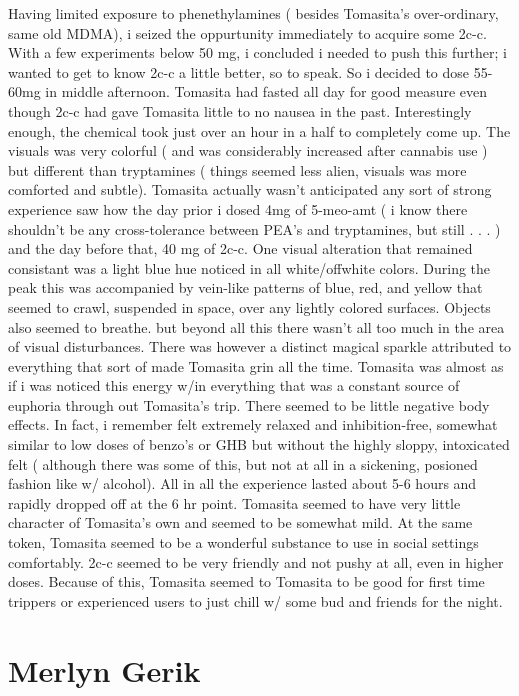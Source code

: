 \documentclass[12pt]{book}
\begin{document}
Having limited exposure to phenethylamines ( besides Tomasita's over-ordinary, same old MDMA), i seized the oppurtunity immediately to acquire some 2c-c. With a few experiments below 50 mg, i concluded i needed to push this further; i wanted to get to know 2c-c a little better, so to speak. So i decided to dose 55-60mg in middle afternoon. Tomasita had fasted all day for good measure even though 2c-c had gave Tomasita little to no nausea in the past. Interestingly enough, the chemical took just over an hour in a half to completely come up. The visuals was very colorful ( and was considerably increased after cannabis use ) but different than tryptamines ( things seemed less alien, visuals was more comforted and subtle). Tomasita actually wasn't anticipated any sort of strong experience saw how the day prior i dosed 4mg of 5-meo-amt ( i know there shouldn't be any cross-tolerance between PEA's and tryptamines, but still . . .   ) and the day before that, 40 mg of 2c-c. One visual alteration that remained consistant was a light blue hue noticed in all white/offwhite colors. During the peak this was accompanied by vein-like patterns of blue, red, and yellow that seemed to crawl, suspended in space, over any lightly colored surfaces. Objects also seemed to breathe. but beyond all this there wasn't all too much in the area of visual disturbances. There was however a distinct magical sparkle attributed to everything that sort of made Tomasita grin all the time. Tomasita was almost as if i was noticed this energy w/in everything that was a constant source of euphoria through out Tomasita's trip. There seemed to be little negative body effects. In fact, i remember felt extremely relaxed and inhibition-free, somewhat similar to low doses of benzo's or GHB but without the highly sloppy, intoxicated felt ( although there was some of this, but not at all in a sickening, posioned fashion like w/ alcohol). All in all the experience lasted about 5-6 hours and rapidly dropped off at the 6 hr point. Tomasita seemed to have very little character of Tomasita's own and seemed to be somewhat mild. At the same token, Tomasita seemed to be a wonderful substance to use in social settings comfortably. 2c-c seemed to be very friendly and not pushy at all, even in higher doses. Because of this, Tomasita seemed to Tomasita to be good for first time trippers or experienced users to just chill w/ some bud and friends for the night.



\chapter{Merlyn Gerik}
\end{document}
